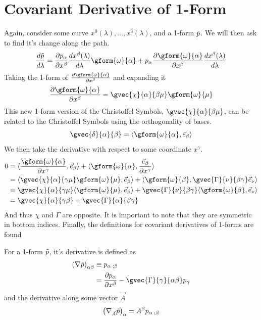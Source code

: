 \section{Covariant Derivative of 1-Form}
Again, consider some curve $x^0(\lambda), \dots, x^3(\lambda)$, and a 1-form $\Tilde{p}$. We will then ask to find it's change along the path.
$$
    \frac{d \Tilde{p}}{d\lambda} = \frac{\partial p_\alpha}{\partial x^\beta} \frac{d x^\beta (\lambda)}{d \lambda} \gform{\omega}{\alpha} + p_\alpha \frac{\partial \gform{\omega}{\alpha}}{\partial x^\beta} \frac{d x^\beta(\lambda)}{d\lambda} $$
Taking the 1-form of $\frac{\partial \gform{\omega}{\alpha}}{\partial x^\beta}$ and expanding it
$$ \frac{\partial \gform{\omega}{\alpha}}{\partial x^\beta} = \gvec{\chi}{\alpha}{\beta \mu} \gform{\omega}{\mu} $$
This new 1-form version of the Christoffel Symbols, $\gvec{\chi}{\alpha}{\beta \mu}$, can be related to the Christoffel Symbols using the orthogonality of bases.
$$ \gvec{\delta}{\alpha}{\beta} = \langle \gform{\omega}{\alpha}, \vec{e}_\beta \rangle $$
We then take the derivative with respect to some coordinate $x^\gamma$.
\begin{align*}
    0 & = \langle \frac{\gform{\omega}{\alpha}}{\partial x^\gamma}, \vec{e}_\beta \rangle + \langle \gform{\omega}{\alpha}, \frac{\vec{e}_\beta}{\partial x^\gamma} \rangle \\ & = \langle \gvec{\chi}{\alpha}{\gamma \mu} \gform{\omega}{\mu}, \vec{e}_\beta \rangle + \langle \gform{\omega}{\beta}, \gvec{\Gamma}{\nu}{\beta \gamma} \vec{e}_\nu\rangle \\ & = \gvec{\chi}{\alpha}{\gamma \mu} \langle\gform{\omega}{\mu}, \vec{e}_\beta \rangle + \gvec{\Gamma}{\nu}{\beta \gamma} \langle \gform{\omega}{\beta},  \vec{e}_\nu\rangle \\ & = \gvec{\chi}{\alpha}{\gamma \beta} + \gvec{\Gamma}{\alpha}{\beta \gamma}
\end{align*}
And thus $\chi$ and $\Gamma$ are opposite. It is important to note that they are symmetric in bottom indices. Finally, the definitions for covariant derivatives of 1-forms are found
\begin{definition}
    For a 1-form $\Tilde{p}$, it's derivative is defined as
    \begin{align*}
        \left( \nabla \Tilde{p} \right)_{\alpha \beta} & \equiv p_{\alpha \; ;\beta} \\
        & = \frac{\partial p_\alpha}{\partial x^\beta} - \gvec{\Gamma}{\gamma}{\alpha \beta} p_\gamma
    \end{align*}
    and the derivative along some vector $\vec{A}$
    $$ \left( \nabla_{\vec{A}} \Tilde{p} \right)_{\alpha} = A^\beta p_{\alpha\; ;\beta} $$
\end{definition}

